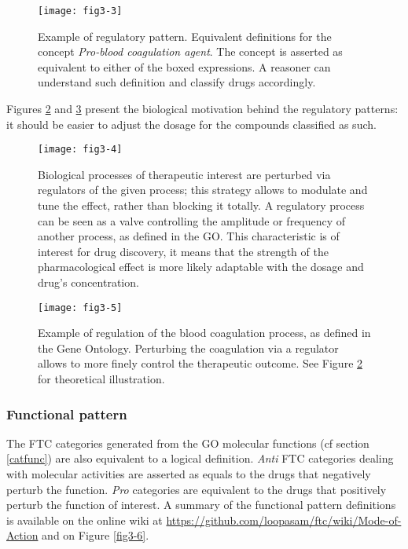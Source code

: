\begin{figure}[H]
    \centering
    \texttt{[image: fig3-3]}
    \caption{Example of regulatory pattern. Equivalent definitions for the concept \emph{Pro-blood coagulation agent}. The concept is asserted as equivalent to either of the boxed expressions. A reasoner can understand such definition and classify drugs accordingly.}
    \label{fig3-3}
\end{figure}

Figures \ref{fig3-4} and \ref{fig3-5} present the biological motivation behind the regulatory patterns: it should be easier to adjust the dosage for the compounds classified as such.

\begin{figure}[ht]
    \centering
    \texttt{[image: fig3-4]}
    \caption{Biological processes of therapeutic interest are perturbed via regulators of the given process; this strategy allows to modulate and tune the effect, rather than blocking it totally. A regulatory process can be seen as a valve controlling the amplitude or frequency of another process, as defined in the GO. This characteristic is of interest for drug discovery, it means that the strength of the pharmacological effect is more likely adaptable with the dosage and drug's concentration.}
    \label{fig3-4}
\end{figure}

\begin{figure}[H]
    \centering
    \texttt{[image: fig3-5]}
    \caption{Example of regulation of the blood coagulation process, as defined in the Gene Ontology. Perturbing the coagulation via a regulator allows to more finely control the therapeutic outcome. See Figure \ref{fig3-4} for theoretical illustration.}
    \label{fig3-5}
\end{figure}

\subsubsection{Functional pattern}
The FTC categories generated from the GO molecular functions (cf section \ref{catfunc}) are also equivalent to a logical definition. \emph{Anti} FTC categories dealing with molecular activities are asserted as equals to the drugs that negatively perturb the function. \emph{Pro} categories are equivalent to the drugs that positively perturb the function of interest. A summary of the functional pattern definitions is available on the online wiki at \url{https://github.com/loopasam/ftc/wiki/Mode-of-Action} and on Figure \ref{fig3-6}.

